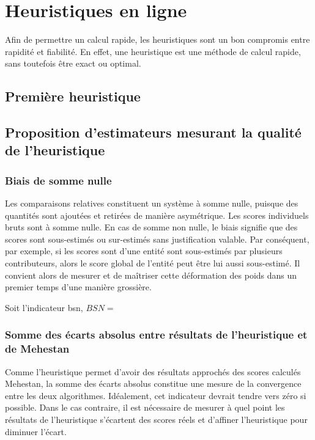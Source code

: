 \section{Heuristiques en ligne}
Afin de permettre un calcul rapide, les heuristiques sont un bon compromis entre rapidité et fiabilité. En effet, une heuristique est une méthode de calcul rapide, sans toutefois être exact ou optimal.

\subsection{Première heuristique}


\subsection{Proposition d'estimateurs mesurant la qualité de l'heuristique}


\subsubsection{Biais de somme nulle}

Les comparaisons relatives constituent un système à somme nulle, puisque des quantités sont ajoutées et retirées de manière asymétrique. Les scores individuels bruts sont à somme nulle. En cas de somme non nulle, le biais signifie que des scores sont sous-estimés ou sur-estimés sans justification valable. Par conséquent, par exemple, si les scores sont d'une entité sont sous-estimés par plusieurs contributeurs, alors le score global de l'entité peut être lui aussi sous-estimé. Il convient alors de mesurer et de maîtriser cette déformation des poids dans un premier temps d'une manière grossière.

Soit l'indicateur \gls{bsn},
$BSN=$

\subsubsection{Somme des écarts absolus entre résultats de l'heuristique et de Mehestan}

Comme l'heuristique permet d'avoir des résultats approchés des scores calculés Mehestan, la somme des écarts absolus constitue une mesure de la convergence entre les deux algorithmes. Idéalement, cet indicateur devrait tendre vers zéro si possible. Dans le cas contraire, il est nécessaire de mesurer à quel point les résultats de l'heuristique s'écartent des scores réels et d'affiner l'heuristique pour diminuer l'écart.

